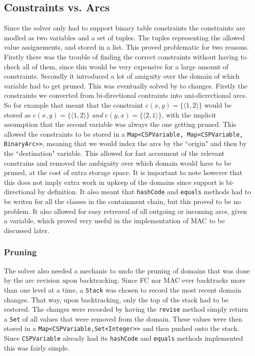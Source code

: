\documentclass[british]{article}
\newcommand{\code}[1]{\texttt{#1}}
\begin{document}
\subsection{Constraints vs. Arcs} Since the solver only had to support binary table constraints the constraints are modled as two variables and a set of tuples. The tuples representing the allowed value assignements, and stored in a list. This proved problematic for two reasons. Firstly there was the trouble of finding the correct constraints without having to check all of them, since this would be very expensive for a large amount of constraints. Secondly it introduced a lot of amiguity over the domain of which variable had to get pruned. This was eventually solved by to changes. Firstly the constraints we converted from bi-directional contraints into uni-dicrectional arcs. So for example that meant that the constraint $c(x,y) = \{\langle1,2\rangle\}$ would be stored as $c(x,y) = \{\langle1,2\rangle\}$ \textit{and} $c(y,x) = \{\langle2,1\rangle\}$, with the implicit assumption that the second variable was always the one getting pruned. This allowed the constraints to be stored in a \code{Map<CSPVariable, Map<CSPVariable, BinaryArc>>}, meaning that we would index the arcs by the ``origin" and then by the ``destination" variable. This allowed for fast accesment of the relevant constrains and removed the ambiguity over which domain would have to be pruned, at the cost of extra storage space. It is important to note however that this does not imply extra work in upkeep of the domains since support is bi-directional by definition. It also meant that \code{hashCode} and \code{equals} methods had to be writen for all the classes in the containment chain, but this proved to be no problem. It also allowed for easy retreaval of all outgoing or incoming arcs, given a variable, which proved very useful in the implementation of MAC to be discussed later. 

\subsubsection{Pruning} The solver also needed a mechanic to undo the pruning of domains that was done by the arc revision upon backtracking. Since FC nor MAC ever backtracks more than one level at a time, a \code{Stack} was chosen to record the most recent domain changes. That way, upon backtracking, only the top of the stack had to be restored. The changes were recorded by having the \code{revise} method simply return a \code{Set} of all values that were removed from the domain. These values were then stored in a \code{Map<CSPVariable,Set<Integer>>}  and then pushed onto the stack. Since \code{CSPVariable} already had its \code{hashCode} and \code{equals} methods implemented this was fairly simple. 
 
\end{document}
